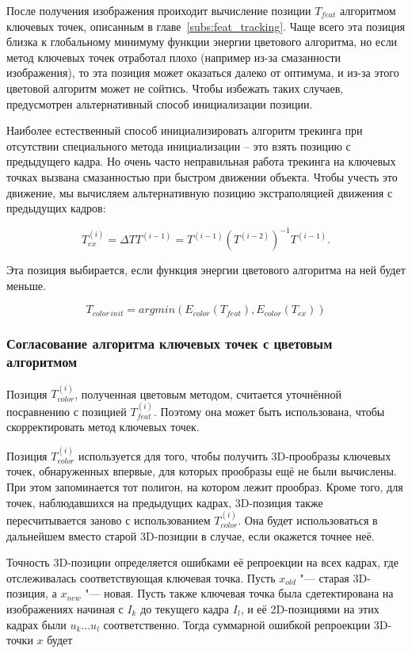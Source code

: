 После получения изображения проиходит вычисление позиции $T_{feat}$ алгоритмом
ключевых точек, описанным в главе~\ref{subs:feat_tracking}.
Чаще всего эта позиция близка к глобальному минимуму функции энергии цветового
алгоритма, но если метод ключевых точек отработал плохо (например из-за
смазанности изображения), то эта позиция может оказаться далеко от оптимума, и
из-за этого цветовой алгоритм может не сойтись.
Чтобы избежать таких случаев, предусмотрен альтернативный способ инициализации
позиции.

Наиболее естественный способ инициализировать алгоритм трекинга при отсутствии
специального метода инициализации -- это взять позицию с предыдущего кадра.
Но очень часто неправильная работа трекинга на ключевых точках вызвана
смазанностью при быстром движении объекта.
Чтобы учесть это движение, мы вычисляем альтернативную позицию экстраполяцией
движения с предыдущих кадров:

\begin{equation}
\label{eqn:extrapolation}
T^{(i)}_{ex} = \Delta T T^{(i - 1)} = T^{(i - 1)}(T^{(i - 2)})^{-1} T^{(i -
1)}
\text{.}
\end{equation}

Эта позиция выбирается, если функция энергии цветового алгоритма на ней будет
меньше.

\begin{equation}
\label{eqn:init_selection}
    T_{color \, init} = argmin(E_{color}(T_{feat}), E_{color}(T_{ex}))
\end{equation}

\subsubsection*{Согласование алгоритма ключевых точек с цветовым алгоритмом}
Позиция $T_{color}^{(i)}$, полученная цветовым методом, считается уточнённой посравнению с позицией $T_{feat}^{(i)}$.
Поэтому она может быть использована, чтобы скорректировать метод ключевых
точек.

Позиция $T_{color}^{(i)}$ используется для того, чтобы получить 3D-прообразы
ключевых точек, обнаруженных впервые, для которых прообразы ещё не были
вычислены.
При этом запоминается тот полигон, на котором лежит прообраз.
Кроме того, для точек, наблюдавшихся на предыдущих кадрах, 3D-позиция также
пересчитывается заново с использованием $T_{color}^{(i)}$.
Она будет использоваться в дальнейшем вместо старой 3D-позиции в случае, если
окажется точнее неё.

Точность 3D-позиции определяется ошибками её репроекции на всех кадрах, где
отслеживалась соответствующая ключевая точка.
Пусть $x_{old}$ "--- старая 3D-позиция, а $x_{new}$ "--- новая. 
Пусть также ключевая точка была сдетектирована на изображениях начиная с $I_k$
до текущего кадра $I_l$, и её 2D-позициями на этих кадрах были $u_k ... u_l$
соответственно.
Тогда суммарной ошибкой репроекции 3D-точки $x$ будет

